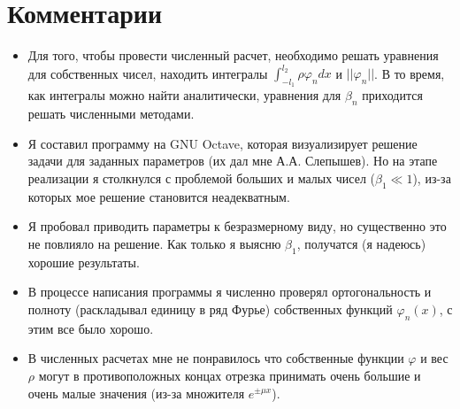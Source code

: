 \documentclass[12pt, a4paper]{article}
\begin{document}
\section{Комментарии}
\begin{itemize}
  \item Для того, чтобы провести численный расчет, необходимо решать уравнения для собственных чисел, находить интегралы $\int_{-l_1}^{l_2} \rho \varphi_n dx$ и $||\varphi_n||$. В то время, как интегралы можно найти аналитически, уравнения для $\beta_n$ приходится решать численными методами.
  \item Я составил программу на GNU Octave, которая визуализирует решение задачи для заданных параметров (их дал мне А.А. Слепышев). Но на этапе реализации я столкнулся с проблемой больших и малых чисел ($\beta_1 \ll 1$), из-за которых мое решение становится неадекватным.
  \item Я пробовал приводить параметры к безразмерному виду, но существенно это не повлияло на решение. Как только я выясню $\beta_1$, получатся (я надеюсь) хорошие результаты.
  \item В процессе написания программы я численно проверял ортогональность и полноту (раскладывал единицу в ряд Фурье) собственных функций $\varphi_n(x)$, с этим все было хорошо.
  \item В численных расчетах мне не понравилось что собственные функции $\varphi$ и вес $\rho$ могут в противоположных концах отрезка принимать очень большие и очень малые значения (из-за множителя $e^{\pm\mu x}$).
\end{itemize}
\end{document}
